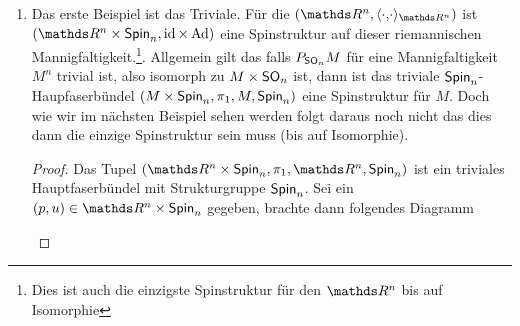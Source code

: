\begin{Bsp}
  \begin{enumerate}[(1)]
  \item Das erste Beispiel ist das Triviale. Für die \RMF
    $(\R^n, \scdots_{\R^n})$ ist
    $(\R^n \times \spin_n,\id \times \Ad)$ eine Spinstruktur auf
    dieser riemannischen Mannigfaltigkeit.\footnote{Dies ist auch die
      einzigste Spinstruktur für den $ \R^n $ bis auf
      Isomorphie}. Allgemein gilt das falls $ P_{\operatorname{\mathsf{SO}}_n}M $ für eine Mannigfaltigkeit
    $ M^n $ trivial ist, also isomorph zu $ M\times \operatorname{\mathsf{SO}}_n $ ist,
    dann ist das triviale $ \operatorname{\mathsf{Spin}}_n $-Haupfaserbündel
    $ (M\times \operatorname{\mathsf{Spin}}_n,\pi_1,M,\operatorname{\mathsf{Spin}}_n) $ eine Spinstruktur für $ M $.
    Doch wie wir im nächsten Beispiel sehen werden folgt daraus noch
    nicht das dies dann die einzige Spinstruktur sein muss (bis auf
    Isomorphie).
    \begin{proof}
      Das Tupel $ (\R^n\times \spin_n,\pi_1,\R^n,\spin_n) $ ist ein
      triviales Hauptfaserbündel mit Strukturgruppe $ \operatorname{\mathsf{Spin}}_n $.  Sei
      ein $ (p,u)\in \R^n\times \spin_n $ gegeben, brachte dann
      folgendes Diagramm
			
      \begin{center}
					
      \end{center}

    \end{proof}
		

\end{enumerate}
\end{Bsp}
